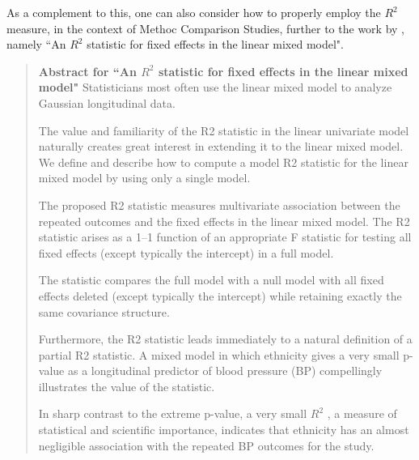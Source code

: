 \documentclass[12pt, a4paper]{report}
\theoremstyle{plain}
\theoremstyle{definition}
\theoremstyle{remark}
\begin{document}
	As a complement to this, one can also consider how to properly employ the $R^2$ measure, in the context of Methoc Comparison Studies, further to the work by \citet{edwards2008}, namely ``An $R^2$ statistic for fixed effects in the linear mixed model".
	
	\begin{framed}
		
		\begin{quote}
			\textbf{Abstract for ``An $R^2$ statistic for fixed effects in the linear mixed model"}
			Statisticians most often use the linear mixed model to analyze Gaussian longitudinal data. 
			
			The value and familiarity of the R2 statistic in the linear univariate model naturally creates great interest in extending it to the linear mixed model. We define and describe how to compute a model R2 statistic for the linear mixed model by using only a single model. 
			
			The proposed R2 statistic measures multivariate association between the repeated outcomes and the fixed effects in the linear mixed model. The R2 statistic arises as a 1–1 function of an appropriate F statistic for testing all fixed effects (except typically the intercept) in a full model. 
			
			The statistic compares the full model with a null model with all fixed effects deleted (except typically the intercept) while retaining exactly the same covariance structure. 
			
			Furthermore, the R2 statistic leads immediately to a natural definition of a partial R2 statistic. A mixed model in which ethnicity gives a very small p-value as a longitudinal predictor of blood pressure (BP) compellingly illustrates the value of the statistic. 
			
			In sharp contrast to the extreme p-value, a very small $R^2$ , a measure of statistical and scientific importance, indicates that ethnicity has an almost negligible association with the repeated BP outcomes for the study.
		\end{quote}
	\end{framed}
	
\end{document}
